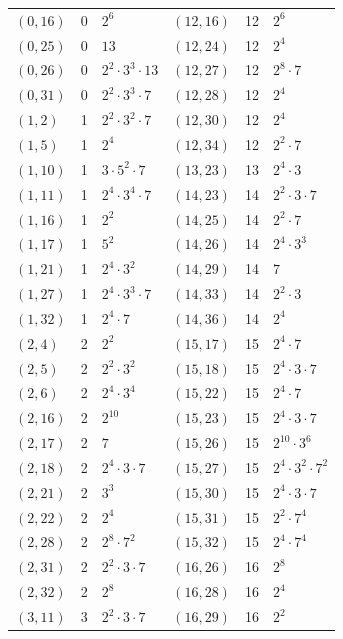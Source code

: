 \documentclass[11pt]{article}
\begin{document}
\begin{longtable}{@{}lrl@{\qquad}lrl@{}}
$(0,16)$ & 0 & $2^{6}$ & $(12,16)$ & 12 & $2^{6}$\\
$(0,25)$ & 0 & $13$ & $(12,24)$ & 12 & $2^{4}$\\
$(0,26)$ & 0 & $2^{2}\cdot 3^{3}\cdot 13$ & $(12,27)$ & 12 & $2^{8}\cdot 7$\\
$(0,31)$ & 0 & $2^{2}\cdot 3^{3}\cdot 7$ & $(12,28)$ & 12 & $2^{4}$\\
$(1,2)$ & 1 & $2^{2}\cdot 3^{2}\cdot 7$ & $(12,30)$ & 12 & $2^{4}$\\
$(1,5)$ & 1 & $2^{4}$ & $(12,34)$ & 12 & $2^{2}\cdot 7$\\
$(1,10)$ & 1 & $3\cdot 5^{2}\cdot 7$ & $(13,23)$ & 13 & $2^{4}\cdot 3$\\
$(1,11)$ & 1 & $2^{4}\cdot 3^{4}\cdot 7$ & $(14,23)$ & 14 & $2^{2}\cdot 3\cdot 7$\\
$(1,16)$ & 1 & $2^{2}$ & $(14,25)$ & 14 & $2^{2}\cdot 7$\\
$(1,17)$ & 1 & $5^{2}$ & $(14,26)$ & 14 & $2^{4}\cdot 3^{3}$\\
$(1,21)$ & 1 & $2^{4}\cdot 3^{2}$ & $(14,29)$ & 14 & $7$\\
$(1,27)$ & 1 & $2^{4}\cdot 3^{3}\cdot 7$ & $(14,33)$ & 14 & $2^{2}\cdot 3$\\
$(1,32)$ & 1 & $2^{4}\cdot 7$ & $(14,36)$ & 14 & $2^{4}$\\
$(2,4)$ & 2 & $2^{2}$ & $(15,17)$ & 15 & $2^{4}\cdot 7$\\
$(2,5)$ & 2 & $2^{2}\cdot 3^{2}$ & $(15,18)$ & 15 & $2^{4}\cdot 3\cdot 7$\\
$(2,6)$ & 2 & $2^{4}\cdot 3^{4}$ & $(15,22)$ & 15 & $2^{4}\cdot 7$\\
$(2,16)$ & 2 & $2^{10}$ & $(15,23)$ & 15 & $2^{4}\cdot 3\cdot 7$\\
$(2,17)$ & 2 & $7$ & $(15,26)$ & 15 & $2^{10}\cdot 3^{6}$\\
$(2,18)$ & 2 & $2^{4}\cdot 3\cdot 7$ & $(15,27)$ & 15 & $2^{4}\cdot 3^{2}\cdot 7^{2}$\\
$(2,21)$ & 2 & $3^{3}$ & $(15,30)$ & 15 & $2^{4}\cdot 3\cdot 7$\\
$(2,22)$ & 2 & $2^{4}$ & $(15,31)$ & 15 & $2^{2}\cdot 7^{4}$\\
$(2,28)$ & 2 & $2^{8}\cdot 7^{2}$ & $(15,32)$ & 15 & $2^{4}\cdot 7^{4}$\\
$(2,31)$ & 2 & $2^{2}\cdot 3\cdot 7$ & $(16,26)$ & 16 & $2^{8}$\\
$(2,32)$ & 2 & $2^{8}$ & $(16,28)$ & 16 & $2^{4}$\\
$(3,11)$ & 3 & $2^{2}\cdot 3\cdot 7$ & $(16,29)$ & 16 & $2^{2}$\\

\end{longtable}
\end{document}
